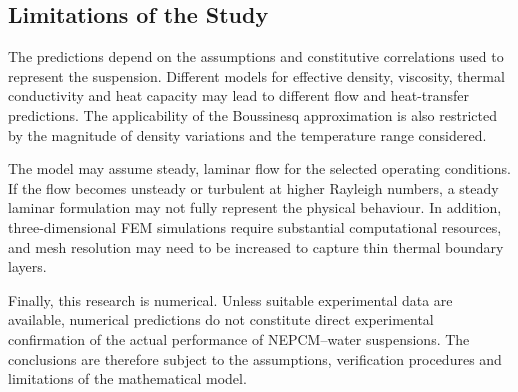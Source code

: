 \subsection{Limitations of the Study}

The predictions depend on the assumptions and constitutive correlations used to represent the suspension. Different models for effective density, viscosity, thermal conductivity and heat capacity may lead to different flow and heat-transfer predictions. The applicability of the Boussinesq approximation is also restricted by the magnitude of density variations and the temperature range considered.

The model may assume steady, laminar flow for the selected operating conditions. If the flow becomes unsteady or turbulent at higher Rayleigh numbers, a steady laminar formulation may not fully represent the physical behaviour. In addition, three-dimensional FEM simulations require substantial computational resources, and mesh resolution may need to be increased to capture thin thermal boundary layers.

Finally, this research is numerical. Unless suitable experimental data are available, numerical predictions do not constitute direct experimental confirmation of the actual performance of NEPCM--water suspensions. The conclusions are therefore subject to the assumptions, verification procedures and limitations of the mathematical model.
